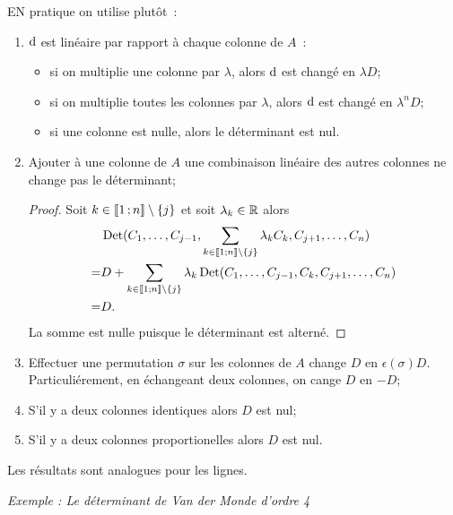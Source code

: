EN pratique on utilise plutôt~:
\begin{enumerate}
\item $\mathrm{d}$ est linéaire par rapport à chaque colonne de $A$~:
  \begin{itemize}
  \item si on multiplie une colonne par $\lambda$, alors $\mathrm{d}$ est changé en $\lambda D$;
  \item si on multiplie toutes les colonnes par $\lambda$, alors $\mathrm{d}$ est changé en $\lambda^n D$;
  \item si une colonne est nulle, alors le déterminant est nul.
  \end{itemize}
\item Ajouter à une colonne de $A$ une combinaison linéaire des autres colonnes ne change pas le déterminant;

\begin{proof}
  Soit $k \in \mathopen{\llbracket}1\mathclose{}\mathpunct{};n\mathclose{\rrbracket}\setminus\{j\}$ et soit $\lambda_k \in \mathbb{R}$ alors
  \begin{align}
    &\operatorname{Det}(C_1, \ldots, C_{j-1}, \sum_{k \in \mathopen{\llbracket}1\mathclose{}\mathpunct{};n\mathclose{\rrbracket}\setminus\{j\}}\lambda_kC_k, C_{j+1}, \ldots, C_n) \\
    =&D + \sum_{k \in \mathopen{\llbracket}1\mathclose{}\mathpunct{};n\mathclose{\rrbracket}\setminus\{j\}}\lambda_k \operatorname{Det}(C_1, \ldots, C_{j-1}, C_k, C_{j+1}, \ldots, C_n) \\
    =&D.
  \end{align}
  La somme est nulle puisque le déterminant est alterné.
\end{proof}
\item Effectuer une permutation $\sigma$ sur les colonnes de $A$ change $D$ en $\epsilon(\sigma)D$. Particuliérement, en échangeant deux colonnes, on cange $D$ en $-D$;
\item S'il y a deux colonnes identiques alors $D$ est nul;
\item S'il y a deux colonnes proportionelles alors $D$ est nul.
\end{enumerate}
Les résultats sont analogues pour les lignes.

\emph{Exemple : Le déterminant de Van der Monde d'ordre 4}

